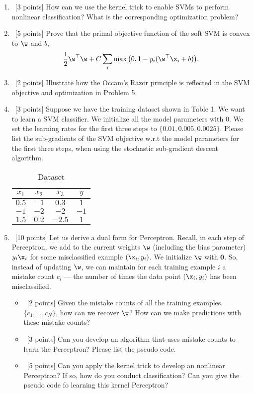 \documentclass[12pt, fullpage,letterpaper]{article}
\begin{document}
\begin{enumerate}
	
	\item~[3 points] How can we use the kernel trick to enable SVMs to perform nonlinear classification? What is the corresponding optimization problem?


	\item~[5 points] Prove that the primal objective function of the soft SVM is convex to $\w$ and $b$, 
	\[
	\frac{1}{2}\w^\top\w + C\sum_{i} \max\big(0, 1 - y_i(\w^\top\x_i+b)\big).
	\]
	
	\item~[2 points] Illustrate how the Occam's Razor principle is reflected in the SVM objective and optimization in Problem 5. 
	
	
	\item~[3 points] Suppose we have the training dataset shown in Table 1. We want to learn a SVM classifier. We initialize all the model parameters with $0$. We set the learning rates for the first three steps to $\{0.01, 0.005, 0.0025\}$.  Please list the sub-gradients of the SVM objective w.r.t the model parameters for the first three steps, when using the stochastic sub-gradient descent algorithm. 
	\begin{table}[h]
		\centering
		\begin{tabular}{ccc|c}
			$x_1$ & $x_2$ & $x_3$ &  $y$\\ 
			\hline\hline
			$0.5$ & $-1$ & $0.3$ & $1$ \\ \hline
			$-1$ & $-2$ & $-2$ & $-1$\\ \hline
			$1.5$ & $0.2$ & $-2.5$ & $1$\\ \hline
		\end{tabular}
	\caption{Dataset}
	\end{table}

	\item~[10 points] Let us derive a dual form for Perceptron. Recall, in each step of Perceptron, we add to the current weights $\w$ (including the bias parameter) $y_i\x_i$ for some misclassified example $(\x_i, y_i)$. We initialize $\w$ with $\mathbf{0}$. So, instead of updating $\w$, we can maintain for each training example $i$ a mistake count $c_i$ --- the number of times the data point $(\x_i, y_i)$ has been misclassified. 
	
	\begin{itemize}
		\item~[2 points] Given the mistake counts of all the training examples, $\{c_1, \ldots, c_N\}$, how can we recover $\w$? How can we make predictions with these mistake counts? 
		\item~[3 points] Can you develop an algorithm that uses mistake counts to learn the Perceptron? Please list the pseudo code. 
		\item~[5 points] Can you apply the kernel trick to develop an nonlinear Perceptron? If so, how do you conduct classification? Can you give the pseudo code fo learning this kernel Perceptron? 
	\end{itemize}   
	
\end{enumerate}
\end{document}
